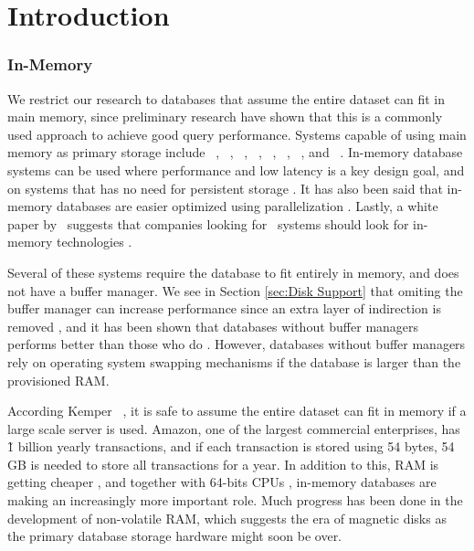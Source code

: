 \chapter{Introduction}
\label{chap:introduction}
\clearpage




\subsection{In-Memory}
\label{sub:In-Memory}
We restrict our research to databases that assume the entire dataset can fit in main memory, since preliminary research have shown that this is a commonly used approach to achieve good query performance. Systems capable of using main memory as primary storage include \oracle~\cite{Lahiri2015-mz}, \saph~\cite{Farber2012-vh}, \gorilla~\cite{Pelkonen2015-ko}, \qlikview~\cite{Qlik2011-ef}, \tableau~\cite{Kamkolkar2015-iq}, \monetdb~\cite{Boncz2002-yj}, \blink~\cite{Barber2012-xt}, and \sapnw~\cite{Lemke2010-is}. In-memory database systems can be used where performance and low latency is a key design goal, and on systems that has no need for persistent storage \cite{Zicari2012-is}. It has also been said that in-memory databases are easier optimized using parallelization \cite{Psaroudakis2013-fn}. Lastly, a white paper by \qlikview~suggests that companies looking for \bi~systems should look for in-memory technologies \cite{Bereanu2010-tj}. 

Several of these systems require the database to fit entirely in memory, and does not have a buffer manager. We see in Section \ref{sec:Disk Support} that omiting the buffer manager can increase performance since an extra layer of indirection is removed \cite{Graefe2014-ds}, and it has been shown that databases without buffer managers performs better than those who do \cite{Ferrari2012-hm}. However, databases without buffer managers rely on operating system swapping mechanisms if the database is larger than the provisioned RAM.

According Kemper \ea~, it is safe to assume the entire dataset can fit in memory \cite{Kemper2011-ap} if a large scale server is used. Amazon, one of the largest commercial enterprises, has \~1 billion yearly transactions, and if each transaction is stored using 54 bytes, 54 GB is needed to store all transactions for a year. In addition to this, RAM is getting cheaper \cite{Exasol2014-xh}, and together with 64-bits CPUs \cite{Delaney2014-ip}, in-memory databases are making an increasingly more important role. Much progress has been done in the development of non-volatile RAM, which suggests the era of magnetic disks as the primary database storage hardware might soon be over. 

